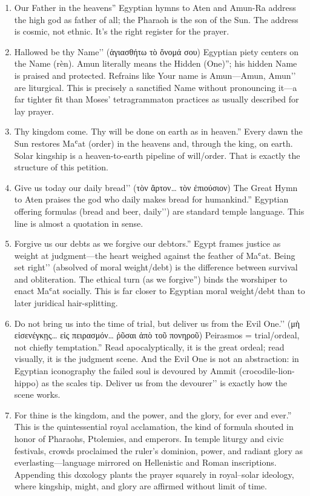 \begin{enumerate}
\def\labelenumi{(\alph{enumi})}
\item
Our Father in the heavens'' Egyptian hymns to Aten and Amun-Ra address the high god as father of all; the Pharaoh is the son of the Sun. The address is cosmic, not ethnic. It's the right register for the prayer.
\item Hallowed be thy Name’’ (ἁγιασθήτω τὸ ὄνομά σου) Egyptian piety centers on the Name (rèn).
Amun literally means the Hidden (One)''; his hidden Name is praised and protected. Refrains like Your name is Amun—Amun, Amun’’ are liturgical.
This is precisely a sanctified Name without pronouncing it—a far tighter fit than Moses’ tetragrammaton practices as usually described for lay prayer.
\item
Thy kingdom come. Thy will be done on earth as in heaven.'' Every dawn the Sun restores Maʿat (order) in the heavens and, through the king, on earth. Solar kingship is a heaven-to-earth pipeline of will/order. That is exactly the structure of this petition.
\item Give us today our daily bread’’ (τὸν ἄρτον\ldots{} τὸν ἐπιούσιον) The Great Hymn to Aten praises the god who daily makes bread for humankind.'' Egyptian offering formulas (bread and beer, daily’’) are standard temple language.
This line is almost a quotation in sense.
\item
Forgive us our debts as we forgive our debtors.'' Egypt frames justice as weight at judgment---the heart weighed against the feather of Maʿat. Being set right’’ (absolved of moral weight/debt) is the difference between survival and obliteration.
The ethical turn (as we forgive'') binds the worshiper to enact Maʿat socially. This is far closer to Egyptian moral weight/debt than to later juridical hair-splitting.
\item Do not bring us into the time of trial, but deliver us from the Evil One.’’ (μὴ εἰσενέγκῃς\ldots{} εἰς πειρασμόν\ldots{} ῥῦσαι ἀπὸ τοῦ πονηροῦ) Peirasmos = trial/ordeal, not chiefly temptation.'' Read apocalyptically, it is the great ordeal; read visually, it is the judgment scene. And the Evil One is not an abstraction: in Egyptian iconography the failed soul is devoured by Ammit (crocodile-lion-hippo) as the scales tip. Deliver us from the devourer’’ is exactly how the scene works.
\item
For thine is the kingdom, and the power, and the glory, for ever and ever.'' This is the quintessential royal acclamation, the kind of formula shouted in honor of Pharaohs, Ptolemies, and emperors. In temple liturgy and civic festivals, crowds proclaimed the ruler’s dominion, power, and radiant glory as everlasting—language mirrored on Hellenistic and Roman inscriptions. Appending this doxology plants the prayer squarely in royal–solar ideology, where kingship, might, and glory are affirmed without limit of time.

\end{enumerate}
